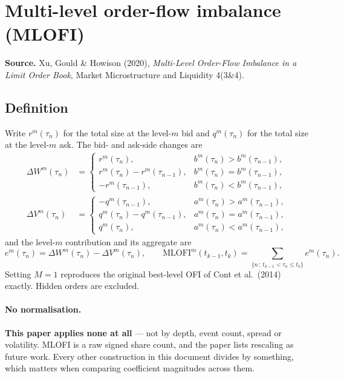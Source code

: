 \documentclass[11pt]{article}
\begin{document}
\section{Multi-level order-flow imbalance (MLOFI)}\label{sec:mlofi}

\textbf{Source.} Xu, Gould \& Howison (2020), \emph{Multi-Level Order-Flow
Imbalance in a Limit Order Book}, Market Microstructure and Liquidity 4(3\&4).

\subsection{Definition}

Write $r^m(\tau_n)$ for the total size at the level-$m$ bid and $q^m(\tau_n)$
for the total size at the level-$m$ ask. The bid- and ask-side changes are
\begin{align}
\Delta W^m(\tau_n)&=
\begin{cases}
r^m(\tau_n), & b^m(\tau_n)>b^m(\tau_{n-1}),\\
r^m(\tau_n)-r^m(\tau_{n-1}), & b^m(\tau_n)=b^m(\tau_{n-1}),\\
-r^m(\tau_{n-1}), & b^m(\tau_n)<b^m(\tau_{n-1}),
\end{cases}
\\[6pt]
\Delta V^m(\tau_n)&=
\begin{cases}
-q^m(\tau_{n-1}), & a^m(\tau_n)>a^m(\tau_{n-1}),\\
q^m(\tau_n)-q^m(\tau_{n-1}), & a^m(\tau_n)=a^m(\tau_{n-1}),\\
q^m(\tau_n), & a^m(\tau_n)<a^m(\tau_{n-1}),
\end{cases}
\end{align}
and the level-$m$ contribution and its aggregate are
\begin{equation}
e^m(\tau_n)=\Delta W^m(\tau_n)-\Delta V^m(\tau_n),
\qquad
\mathrm{MLOFI}^m(t_{k-1},t_k)=\sum_{\{n\,:\,t_{k-1}<\tau_n\le t_k\}} e^m(\tau_n).
\end{equation}
Setting $M=1$ reproduces the original best-level OFI of Cont et al.\ (2014)
exactly. Hidden orders are excluded.

\paragraph{No normalisation.} \textbf{This paper applies none at all} --- not by
depth, event count, spread or volatility. MLOFI is a raw signed share count, and
the paper lists rescaling as future work. Every other construction in this
document divides by something, which matters when comparing coefficient
magnitudes across them.
\end{document}
